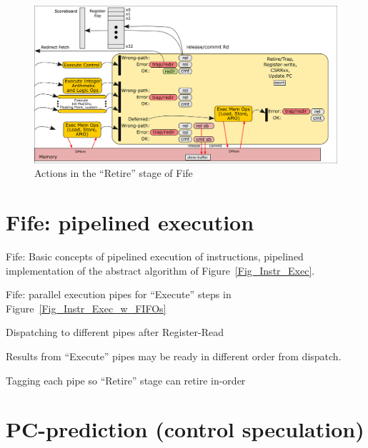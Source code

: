\begin{figure}[htbp]
  \centerline{\includegraphics[width=6in,angle=0]{ch710_Pending/Figures/Fig_Fife_Retire}}
  \caption{\label{Fig_Fife_Retire}Actions in the ``Retire'' stage of Fife}
\end{figure}

\hdivider


\section{Fife: pipelined execution}

Fife: Basic concepts of pipelined execution of instructions, {\ie}
pipelined implementation of the abstract algorithm of
Figure~\ref{Fig_Instr_Exec}.

Fife: parallel execution pipes for ``Execute'' steps in
Figure~\ref{Fig_Instr_Exec_w_FIFOs}

\begin{tightlist}

  \item Dispatching to different pipes after Register-Read

  \item Results from ``Execute'' pipes may be ready in different order from dispatch.

  \item   Tagging each pipe so ``Retire'' stage can retire in-order
\end{tightlist}



\section{PC-prediction (control speculation)}

